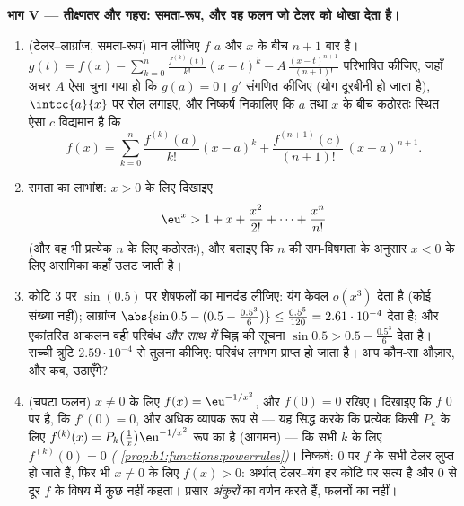 \begin{problem}
\medskip \noindent\textbf{भाग V --- तीक्ष्णतर और गहरा: समता-रूप, और वह फलन
जो टेलर को धोखा देता है।}
\begin{enumerate}[resume]
  \item (टेलर--लाग्रांज, समता-रूप) मान लीजिए $f$ $a$ और $x$ के बीच $n + 1$
  बार  है। $g(t) = f(x) - \sum_{k=0}^{n} \frac{f^{(k)}(t)}{k!}(x -
  t)^k - A\,\frac{(x-t)^{n+1}}{(n+1)!}$ परिभाषित कीजिए, जहाँ अचर $A$ ऐसा
  चुना गया हो कि $g(a) = 0$। $g'$ संगणित कीजिए (योग दूरबीनी हो जाता है),
  $\intcc{a}{x}$ पर रोल लगाइए, और निष्कर्ष निकालिए कि $a$ तथा $x$ के बीच
  कठोरतः स्थित ऐसा $c$ विद्यमान है कि
        \[
        f(x) = \sum_{k=0}^{n} \frac{f^{(k)}(a)}{k!}(x-a)^k
        + \frac{f^{(n+1)}(c)}{(n+1)!}\,(x-a)^{n+1} .
        \]
  \item समता का लाभांश: $x > 0$ के लिए दिखाइए
        \[
        \eu^x > 1 + x + \frac{x^2}{2!} + \dots +
        \frac{x^n}{n!}
        \]
        (और वह भी प्रत्येक $n$ के लिए कठोरतः), और बताइए कि $n$ की सम-विषमता
        के अनुसार $x < 0$ के लिए असमिका कहाँ उलट जाती है।
  \item कोटि $3$ पर $\sin(0.5)$ पर शेषफलों का मानदंड लीजिए: यंग केवल
  $o(x^3)$ देता है (कोई संख्या नहीं); लाग्रांज $\abs{\sin 0.5 - (0.5 -
  \frac{0.5^3}{6})} \leq \frac{0.5^5}{120} = 2.61\cdot10^{-4}$ देता है; और
  एकांतरित आकलन वही परिबंध \emph{और साथ में} चिह्न की सूचना $\sin 0.5 > 0.5
  - \frac{0.5^3}{6}$ देता है। सच्ची त्रुटि $2.59\cdot10^{-4}$ से तुलना
  कीजिए: परिबंध लगभग प्राप्त हो जाता है। आप कौन-सा औज़ार, और कब, उठाएँगे?
  \item (चपटा फलन) $x \neq 0$ के लिए $f(x) = \eu^{-1/x^2}$, और $f(0) = 0$
  रखिए। दिखाइए कि $f$ $0$ पर  है, कि $f'(0) = 0$, और अधिक व्यापक रूप से
  --- यह सिद्ध करके कि प्रत्येक  किसी  $P_k$ के लिए $f^{(k)}(x) =
  P_k\bigl(\frac1x\bigr)\eu^{-1/x^2}$ रूप का है (आगमन) --- कि सभी $k$ के लिए
  $f^{(k)}(0) = 0$ \emph{(
  \cref{prop:b1:functions:powerrules})}। निष्कर्ष: $0$ पर $f$ के सभी टेलर
   लुप्त हो जाते हैं, फिर भी $x \neq 0$ के लिए $f(x) > 0$: अर्थात्
  टेलर--यंग हर कोटि पर सत्य है और $0$ से दूर $f$ के विषय में कुछ नहीं कहता।
  प्रसार \emph{अंकुरों} का वर्णन करते हैं, फलनों का नहीं।
\end{enumerate}


\end{problem}
